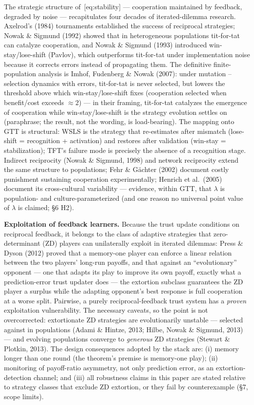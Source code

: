 \documentclass[
]{article}
\begin{document}
The strategic structure of~{[}eq:stability{]} --- cooperation maintained
by feedback, degraded by noise --- recapitulates four decades of
iterated-dilemma research. Axelrod's (1984) tournaments established the
success of reciprocal strategies; Nowak \& Sigmund (1992) showed that in
heterogeneous populations tit-for-tat can catalyze cooperation, and
Nowak \& Sigmund (1993) introduced win-stay/lose-shift (Pavlov), which
outperforms tit-for-tat under implementation noise because it corrects
errors instead of propagating them. The definitive finite-population
analysis is Imhof, Fudenberg \& Nowak (2007): under mutation --
selection dynamics with errors, tit-for-tat is never selected, but
lowers the threshold above which win-stay/lose-shift fixes (cooperation
selected when benefit/cost exceeds \(\approx 2\)) --- in their framing,
tit-for-tat catalyzes the emergence of cooperation while
win-stay/lose-shift is the strategy evolution settles on (paraphrase;
the result, not the wording, is load-bearing). The mapping onto GTT is
structural: WSLS is the strategy that re-estimates after mismatch
(lose-shift = recognition + activation) and restores after validation
(win-stay = stabilization); TFT's failure mode is precisely the absence
of a recognition stage. Indirect reciprocity (Nowak \& Sigmund, 1998)
and network reciprocity extend the same structure to populations; Fehr
\& Gächter (2002) document costly punishment sustaining cooperation
experimentally; Henrich et al.~(2005) document its cross-cultural
variability --- evidence, within GTT, that \(\lambda\) is population-
and culture-parameterized (and one reason no universal point value of
\(\lambda\) is claimed; §6 H2).

\textbf{Exploitation of feedback learners.} Because the trust update
conditions on reciprocal feedback, it belongs to the class of adaptive
strategies that zero-determinant (ZD) players can unilaterally exploit
in iterated dilemmas: Press \& Dyson (2012) proved that a memory-one
player can enforce a linear relation between the two players' long-run
payoffs, and that against an ``evolutionary'' opponent --- one that
adapts its play to improve its own payoff, exactly what a
prediction-error trust updater does --- the extortion subclass
guarantees the ZD player a surplus while the adapting opponent's best
response is full cooperation at a worse split. Pairwise, a purely
reciprocal-feedback trust system has a \emph{proven} exploitation
vulnerability. The necessary caveats, so the point is not overcorrected:
extortionate ZD strategies are evolutionarily unstable --- selected
against in populations (Adami \& Hintze, 2013; Hilbe, Nowak \& Sigmund,
2013) --- and evolving populations converge to \emph{generous} ZD
strategies (Stewart \& Plotkin, 2013). The design consequences adopted
by the stack are: (i) memory longer than one round (the theorem's
premise is memory-one play); (ii) monitoring of payoff-ratio asymmetry,
not only prediction error, as an extortion-detection channel; and (iii)
all robustness claims in this paper are stated relative to strategy
classes that exclude ZD extortion, or they fail by counterexample (§7,
scope limits).
\end{document}

